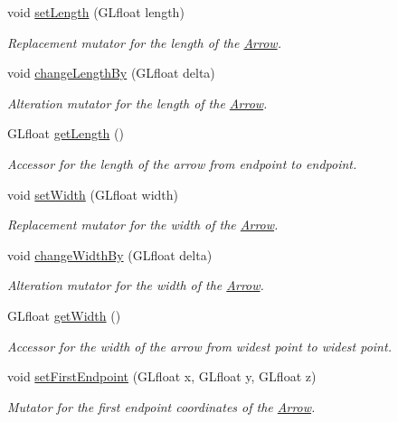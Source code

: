 \begin{DoxyCompactItemize}
void \hyperlink{classtsgl_1_1_arrow_aa87af78d9783fb12c07cbf5b93252b70}{set\+Length} (G\+Lfloat length)
\begin{DoxyCompactList}\small\item\em Replacement mutator for the length of the \hyperlink{classtsgl_1_1_arrow}{Arrow}. \end{DoxyCompactList}\item 
void \hyperlink{classtsgl_1_1_arrow_ab78359a1c86a74491116657d7c629872}{change\+Length\+By} (G\+Lfloat delta)
\begin{DoxyCompactList}\small\item\em Alteration mutator for the length of the \hyperlink{classtsgl_1_1_arrow}{Arrow}. \end{DoxyCompactList}\item 
G\+Lfloat \hyperlink{classtsgl_1_1_arrow_a26d2e0e5ab4856b1cd998ec5ebccb9bb}{get\+Length} ()
\begin{DoxyCompactList}\small\item\em Accessor for the length of the arrow from endpoint to endpoint. \end{DoxyCompactList}\item 
void \hyperlink{classtsgl_1_1_arrow_aea3e79fc0b28a86e6726b1a7c3caabfe}{set\+Width} (G\+Lfloat width)
\begin{DoxyCompactList}\small\item\em Replacement mutator for the width of the \hyperlink{classtsgl_1_1_arrow}{Arrow}. \end{DoxyCompactList}\item 
void \hyperlink{classtsgl_1_1_arrow_a5c36193adf4e20487bb596263bb622f2}{change\+Width\+By} (G\+Lfloat delta)
\begin{DoxyCompactList}\small\item\em Alteration mutator for the width of the \hyperlink{classtsgl_1_1_arrow}{Arrow}. \end{DoxyCompactList}\item 
G\+Lfloat \hyperlink{classtsgl_1_1_arrow_aac07322718ccdb64dfd847b300569142}{get\+Width} ()
\begin{DoxyCompactList}\small\item\em Accessor for the width of the arrow from widest point to widest point. \end{DoxyCompactList}\item 
void \hyperlink{classtsgl_1_1_arrow_a3e34a585aa8c598746d838f2516fe598}{set\+First\+Endpoint} (G\+Lfloat x, G\+Lfloat y, G\+Lfloat z)
\begin{DoxyCompactList}\small\item\em Mutator for the first endpoint coordinates of the \hyperlink{classtsgl_1_1_arrow}{Arrow}. \end{DoxyCompactList}\item 

\end{DoxyCompactItemize}

